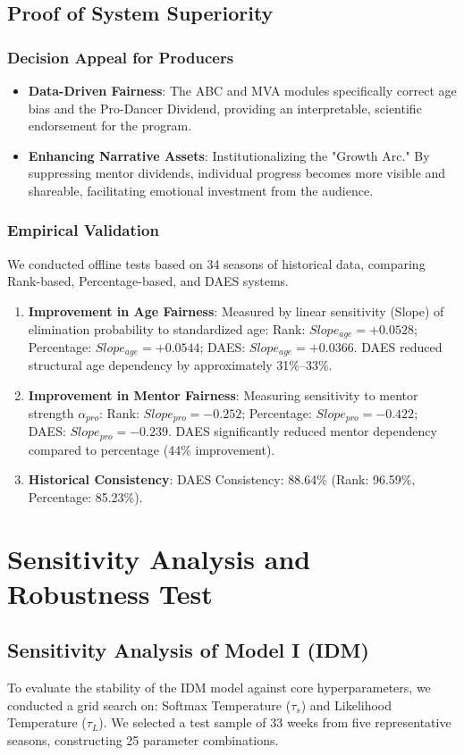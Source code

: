 \documentclass[12pt]{article}
\begin{document}
	\subsection{Proof of System Superiority}
	\subsubsection{Decision Appeal for Producers}
	\begin{itemize}
		\item \textbf{Data-Driven Fairness}: The ABC and MVA modules specifically correct age bias and the Pro-Dancer Dividend, providing an interpretable, scientific endorsement for the program.
		\item \textbf{Enhancing Narrative Assets}: Institutionalizing the "Growth Arc." By suppressing mentor dividends, individual progress becomes more visible and shareable, facilitating emotional investment from the audience.
	\end{itemize}
	
	\subsubsection{Empirical Validation}
	We conducted offline tests based on 34 seasons of historical data, comparing Rank-based, Percentage-based, and DAES systems.
	\begin{enumerate}
		\item \textbf{Improvement in Age Fairness}: Measured by linear sensitivity (Slope) of elimination probability to standardized age:
		Rank: $Slope_{age} = +0.0528$; Percentage: $Slope_{age} = +0.0544$; DAES: $Slope_{age} = +0.0366$.
		DAES reduced structural age dependency by approximately 31\%–33\%.
		\item \textbf{Improvement in Mentor Fairness}: Measuring sensitivity to mentor strength $\alpha_{pro}$:
		Rank: $Slope_{pro} = -0.252$; Percentage: $Slope_{pro} = -0.422$; DAES: $Slope_{pro} = -0.239$.
		DAES significantly reduced mentor dependency compared to percentage (44\% improvement).
		\item \textbf{Historical Consistency}: DAES Consistency: 88.64\% (Rank: 96.59\%, Percentage: 85.23\%).
	\end{enumerate}
	
	\section{Sensitivity Analysis and Robustness Test}
	\subsection{Sensitivity Analysis of Model I (IDM)}
	To evaluate the stability of the IDM model against core hyperparameters, we conducted a grid search on: Softmax Temperature ($\tau_s$) and Likelihood Temperature ($\tau_L$). We selected a test sample of 33 weeks from five representative seasons, constructing 25 parameter combinations.
	
\end{document}
